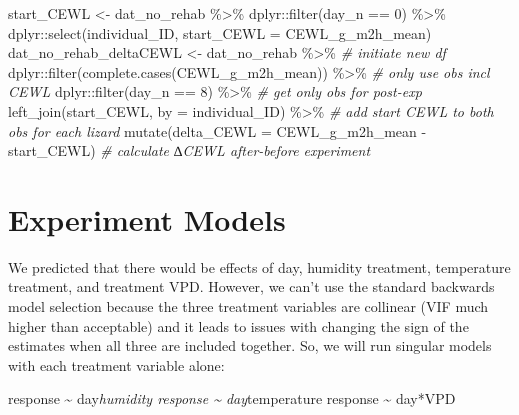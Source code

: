 \documentclass[
]{article}
\newenvironment{Shaded}{\begin{snugshade}}{\end{snugshade}}
\newcommand{\AttributeTok}[1]{\textcolor[rgb]{0.77,0.63,0.00}{#1}}
\newcommand{\CommentTok}[1]{\textcolor[rgb]{0.56,0.35,0.01}{\textit{#1}}}
\newcommand{\DecValTok}[1]{\textcolor[rgb]{0.00,0.00,0.81}{#1}}
\newcommand{\FunctionTok}[1]{\textcolor[rgb]{0.00,0.00,0.00}{#1}}
\newcommand{\NormalTok}[1]{#1}
\newcommand{\OtherTok}[1]{\textcolor[rgb]{0.56,0.35,0.01}{#1}}
\newcommand{\SpecialCharTok}[1]{\textcolor[rgb]{0.00,0.00,0.00}{#1}}
\newcommand{\StringTok}[1]{\textcolor[rgb]{0.31,0.60,0.02}{#1}}
\begin{document}
\begin{Shaded}
\begin{Highlighting}[]
\NormalTok{start\_CEWL }\OtherTok{\textless{}{-}}\NormalTok{ dat\_no\_rehab }\SpecialCharTok{\%\textgreater{}\%}
\NormalTok{  dplyr}\SpecialCharTok{::}\FunctionTok{filter}\NormalTok{(day\_n }\SpecialCharTok{==} \DecValTok{0}\NormalTok{) }\SpecialCharTok{\%\textgreater{}\%}
\NormalTok{  dplyr}\SpecialCharTok{::}\FunctionTok{select}\NormalTok{(individual\_ID, }\AttributeTok{start\_CEWL =}\NormalTok{ CEWL\_g\_m2h\_mean)}
\NormalTok{dat\_no\_rehab\_deltaCEWL }\OtherTok{\textless{}{-}}\NormalTok{ dat\_no\_rehab }\SpecialCharTok{\%\textgreater{}\%} \CommentTok{\# initiate new df}
\NormalTok{  dplyr}\SpecialCharTok{::}\FunctionTok{filter}\NormalTok{(}\FunctionTok{complete.cases}\NormalTok{(CEWL\_g\_m2h\_mean)) }\SpecialCharTok{\%\textgreater{}\%} \CommentTok{\# only use obs incl CEWL}
\NormalTok{  dplyr}\SpecialCharTok{::}\FunctionTok{filter}\NormalTok{(day\_n }\SpecialCharTok{==} \DecValTok{8}\NormalTok{) }\SpecialCharTok{\%\textgreater{}\%} \CommentTok{\# get only obs for post{-}exp}
  \FunctionTok{left\_join}\NormalTok{(start\_CEWL, }\AttributeTok{by =} \StringTok{\textquotesingle{}individual\_ID\textquotesingle{}}\NormalTok{) }\SpecialCharTok{\%\textgreater{}\%} \CommentTok{\# add start CEWL to both obs for each lizard}
  \FunctionTok{mutate}\NormalTok{(}\AttributeTok{delta\_CEWL =}\NormalTok{ CEWL\_g\_m2h\_mean }\SpecialCharTok{{-}}\NormalTok{ start\_CEWL) }\CommentTok{\# calculate ∆CEWL after{-}before experiment}
\end{Highlighting}
\end{Shaded}

\hypertarget{experiment-models}{%
\section{Experiment Models}\label{experiment-models}}

We predicted that there would be effects of day, humidity treatment,
temperature treatment, and treatment VPD. However, we can't use the
standard backwards model selection because the three treatment variables
are collinear (VIF much higher than acceptable) and it leads to issues
with changing the sign of the estimates when all three are included
together. So, we will run singular models with each treatment variable
alone:

response \textasciitilde{} day\emph{humidity response \textasciitilde{}
day}temperature response \textasciitilde{} day*VPD
\end{document}
